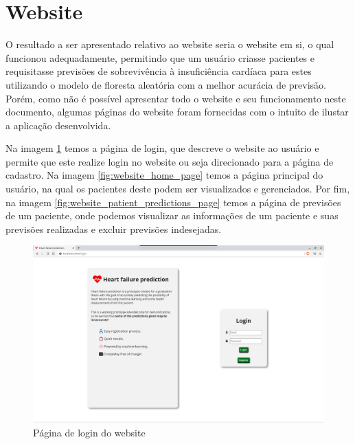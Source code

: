 \section{Website}

O resultado a ser apresentado relativo ao website seria o website em si, o qual funcionou adequadamente, permitindo que um usuário criasse pacientes e requisitasse previsões de sobrevivência à insuficiência cardíaca para estes utilizando o modelo de floresta aleatória com a melhor acurácia de previsão. Porém, como não é possível apresentar todo o website e seu funcionamento neste documento, algumas páginas do website foram fornecidas com o intuito de ilustar a aplicação desenvolvida.

Na imagem \ref{fig:website_login_page} temos a página de login, que descreve o website ao usuário e permite que este realize login no website ou seja direcionado para a página de cadastro. Na imagem \ref{fig:website_home_page} temos a página principal do usuário, na qual os pacientes deste podem ser visualizados e gerenciados. Por fim, na imagem \ref{fig:website_patient_predictions_page} temos a página de previsões de um paciente, onde podemos visualizar as informações de um paciente e suas previsões realizadas e excluir previsões indesejadas.

\begin{figure}[ht!]
	\centering
  \includegraphics[scale=0.26]{images/website_pagina_login.png}
  \caption{Página de login do website}
  \label{fig:website_login_page}
\end{figure}

